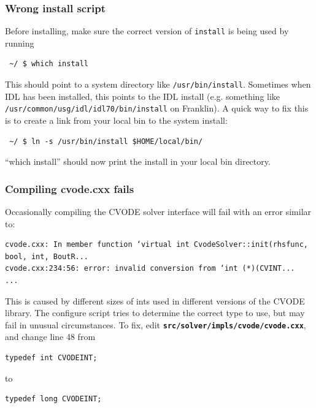 \documentclass[12pt]{article}
\newcommand{\file}[1]{\texttt{\bf #1}}
\begin{document}
\subsubsection{Wrong install script}
%
Before installing, make sure the correct version of \texttt{install} is being
used by running
%
\begin{verbatim}
 ~/ $ which install
\end{verbatim}
%
This should point to a system directory like \texttt{/usr/bin/install}.
Sometimes when IDL has been installed, this points to the IDL install (e.g.
something like \texttt{/usr/common/usg/idl/idl70/bin/install} on Franklin). A
quick way to fix this is to create a link from your local bin to the system
install:
%
\begin{verbatim}
 ~/ $ ln -s /usr/bin/install $HOME/local/bin/
\end{verbatim}
%
``which install'' should now print the install in your local bin directory.


\subsubsection{Compiling cvode.cxx fails}
%
%
Occasionally compiling the CVODE solver interface will fail with an error
similar to:
%
\begin{verbatim}
cvode.cxx: In member function ‘virtual int CvodeSolver::init(rhsfunc, bool, int, BoutR...
cvode.cxx:234:56: error: invalid conversion from ‘int (*)(CVINT...
...
\end{verbatim}
%
This is caused by different sizes of ints used in different versions of the
CVODE library.  The configure script tries to determine the correct type to
use, but may fail in unusual circumstances.  To fix, edit
\file{src/solver/impls/cvode/cvode.cxx}, and change line 48 from
%
\begin{lstlisting}[numbers=none]
typedef int CVODEINT;
\end{lstlisting}
%
to
%
\begin{lstlisting}[numbers=none]
typedef long CVODEINT;
\end{lstlisting}
%
\end{document}
